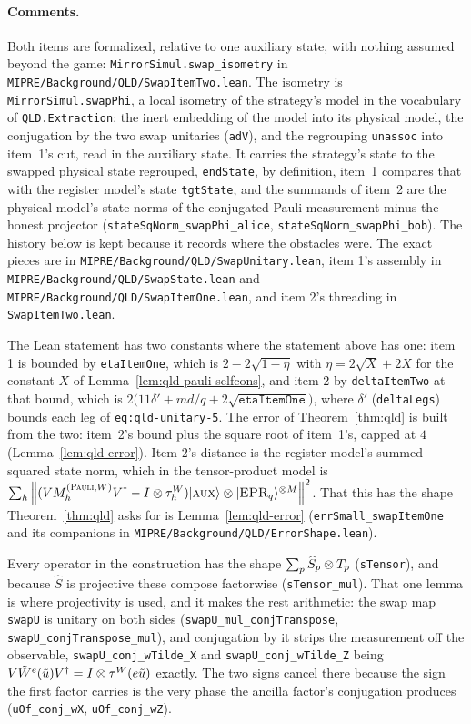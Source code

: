 \paragraph{Comments.} Both items are formalized, relative to one auxiliary state, with nothing
assumed beyond the game: \texttt{MirrorSimul.swap\_isometry} in
\texttt{MIPRE/Background/QLD/SwapItemTwo.lean}. The isometry is \texttt{MirrorSimul.swapPhi}, a
local isometry of the strategy's model in the vocabulary of \texttt{QLD.Extraction}: the inert
embedding of the model into its physical model, the conjugation by the two swap unitaries
(\texttt{adV}), and the regrouping \texttt{unassoc} into item~1's cut, read in the auxiliary state.
It carries the strategy's state to the swapped physical state regrouped, \texttt{endState}, by
definition, item~1 compares that with the register model's state
\texttt{tgtState}, and the summands of item~2 are the physical model's state norms of the conjugated
Pauli measurement minus the honest projector (\texttt{stateSqNorm\_swapPhi\_alice},
\texttt{stateSqNorm\_swapPhi\_bob}). The history below is kept because it records where the
obstacles were. The exact pieces are in \texttt{MIPRE/Background/QLD/SwapUnitary.lean}, item
1's assembly in \texttt{MIPRE/Background/QLD/SwapState.lean} and
\texttt{MIPRE/Background/QLD/SwapItemOne.lean}, and item 2's threading in
\texttt{SwapItemTwo.lean}.

The Lean statement has two constants where the statement above has one: item 1 is bounded by
\texttt{etaItemOne}, which is $2 - 2\sqrt{1 - \eta}$ with $\eta = 2\sqrt{X} + 2X$ for the constant
$X$ of Lemma~\ref{lem:qld-pauli-selfcons}, and item 2 by \texttt{deltaItemTwo} at that bound, which
is $2\bigl( 11 \delta' + md/q + 2 \sqrt{\texttt{etaItemOne}} \bigr)$, where $\delta'$
(\texttt{deltaLegs}) bounds each leg of \texttt{eq:qld-unitary-5}. The error of
Theorem~\ref{thm:qld} is built from the two: item~2's bound plus the square root of item~1's, capped
at $4$ (Lemma~\ref{lem:qld-error}). Item 2's distance is the register model's summed squared state
norm, which in the tensor-product model is
$\sum_h \left\| {(V M^{(\textsc{Pauli},W)}_h V^\dagger - I \otimes \tau^W_h) |\textsc{aux}\rangle \otimes
|\textsc{EPR}_q\rangle^{\otimes M}} \right\|^2$. That this has the shape Theorem~\ref{thm:qld} asks for is
Lemma~\ref{lem:qld-error} (\texttt{errSmall\_swapItemOne} and its companions in
\texttt{MIPRE/Background/QLD/ErrorShape.lean}).

Every operator in the construction has the shape $\sum_p \widehat{S}_p \otimes T_p$
(\texttt{sTensor}), and because $\widehat{S}$ is projective these compose factorwise
(\texttt{sTensor\_mul}). That one lemma is where projectivity is used, and it makes the rest
arithmetic: the swap map \texttt{swapU} is unitary on both sides
(\texttt{swapU\_mul\_conjTranspose}, \texttt{swapU\_conjTranspose\_mul}), and conjugation by it
strips the measurement off the observable, \texttt{swapU\_conj\_wTilde\_X} and
\texttt{swapU\_conj\_wTilde\_Z} being
$V \tilde{W}^e(\tilde{u}) V^\dagger = I \otimes \tau^W(e \tilde{u})$ exactly. The two signs
cancel there because the sign the first factor carries is the very phase the ancilla factor's
conjugation produces (\texttt{uOf\_conj\_wX}, \texttt{uOf\_conj\_wZ}).

